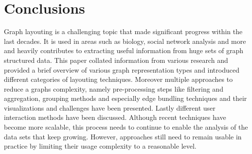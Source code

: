 \section{Conclusions}
Graph layouting is a challenging topic that made significant progress within the last decades. It is used in areas such as biology, social network analysis and more and heavily contributes to extracting useful information from huge sets of graph structured data. This paper collated information from various research and provided a brief overview of various graph representation types and introduced different categories of layouting techniques. Moreover multiple approaches to reduce a graphs complexity, namely pre-processing steps like filtering and aggregation, grouping methods and especially edge bundling techniques and their visualizations and challenges have been presented. Lastly different user interaction methods have been discussed. Although recent techniques have become more scalable, this process needs to continue to enable the analysis of the data sets that keep growing. However, approaches still need to remain usable in practice by  limiting their usage complexity to a reasonable level.



%








